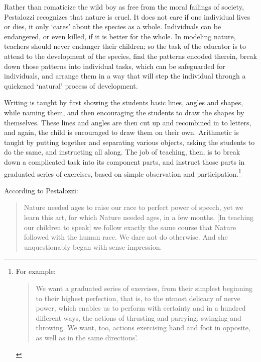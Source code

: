 Rather than romaticize the wild boy as free from the moral failings of society, Pestalozzi recognizes that nature is cruel. It does not care if one individual lives or dies, it only `cares' about the species as a whole. Individuals can be endangered, or even killed, if it is better for the whole. In modeling nature, teachers should never endanger their children; so the task of the educator is to attend to the development of the species, find the patterns encoded therein, break down those patterns into individual tasks, which can be safeguarded for individuals, and arrange them in a way that will step the individual through a quickened `natural' process of development. 

Writing is taught by first showing the students basic lines, angles and shapes, while naming them, and then encouraging the students to draw the shapes by themselves. These lines and angles are then cut up and recombined in to letters, and again, the child is encouraged to draw them on their own. Arithmetic is taught by putting together and separating various objects, asking the students to do the same, and instructing all along. The job of teaching, then, is to break down a complicated task into its component parts, and instruct those parts in graduated series of exercises, based on simple observation and participation.\footnote{For example: 

\begin{quote}

We want a graduated series of exercises, from their simplest beginning to their highest perfection, that is, to the utmost delicacy of nerve power, which enables us to perform with certainty and in a hundred different ways, the actions of thrusting and parrying, swinging and throwing. We want, too, actions exercising hand and foot in opposite, as well as in the same directions'. ~\citep[p. 178]{Pestalozzi:1894vz}
\end{quote}} 

According to Pestalozzi:

\begin{quote}

Nature needed ages to raise our race to perfect power of speech, yet we learn this art, for which Nature needed ages, in a few months. [In teaching our children to speak] we follow exactly the same course that Nature followed with the human race. We dare not do otherwise. And she unquestionably began with sense-impression. ~\citep[p. 149--150]{Pestalozzi:1894vz}
\end{quote}

